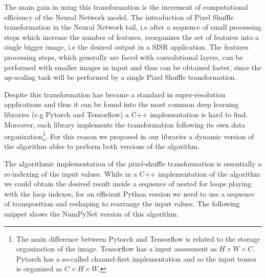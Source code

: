 \documentclass{standalone}
\begin{document}
The main gain in using this transformation is the increment of computational efficiency of the Neural Network model.
The introduction of Pixel Shuffle transformation in the Neural Network tail, i.e after a sequence of small processing steps which increase the number of features, reorganizes the set of features into a single bigger image, i.e the desired output in a SISR application.
The features processing steps, which generally are faced with convolutional layers, can be performed with smaller images in input and thus can be obtained faster, since the up-scaling task will be performed by a single Pixel Shuffle transformation.

Despite this transformation has became a standard in super-resolution applications and thus it can be found into the most common deep learning libraries (e.g \textsf{Pytorch} and \textsf{Tensorflow}) a \textsf{C++} implementation is hard to find.
Moreover, each library implements the transformation following its own data organization\footnote{
  The main difference between \textsf{Pytorch} and \textsf{Tensorflow} is related to the storage organization of the image.
  \textsf{Tensorflow} has a  input assessment as $H \times W \times C$.
  \textsf{Pytorch} has a so-called channel-first implementation and so the input tensor is organized as $C \times H \times W$.
}.
For this reason we proposed in our libraries a dynamic version of the algorithm ables to perform both versions of the algorithm.

The algorithmic implementation of the pixel-shuffle transformation is essentially a re-indexing of the input values.
While in a \textsf{C++} implementation of the algorithm we could obtain the desired result inside a sequence of nested for loops playing with the loop indexes, for an efficient \textsf{Python} version we need to use a sequence of transposition and reshaping to rearrange the input values.
The following snippet shows the \textsf{NumPyNet} version of this algorithm.
\end{document}
